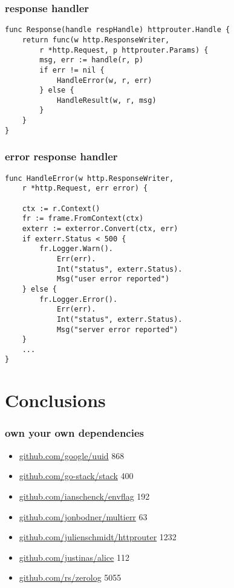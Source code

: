 \documentclass{beamer}
\begin{document}
\begin{frame}[fragile]
\frametitle{response handler}
\begin{lstlisting}[basicstyle=\ttfamily\footnotesize]
func Response(handle respHandle) httprouter.Handle {
	return func(w http.ResponseWriter,
		r *http.Request, p httprouter.Params) {
		msg, err := handle(r, p)
		if err != nil {
			HandleError(w, r, err)
		} else {
			HandleResult(w, r, msg)
		}
	}
}
\end{lstlisting}
\end{frame}

\begin{frame}[fragile]
\frametitle{error response handler}
\begin{lstlisting}[basicstyle=\ttfamily\footnotesize]
func HandleError(w http.ResponseWriter,
	r *http.Request, err error) {

	ctx := r.Context()
	fr := frame.FromContext(ctx)
	exterr := exterror.Convert(ctx, err)
	if exterr.Status < 500 {
		fr.Logger.Warn().
			Err(err).
			Int("status", exterr.Status).
			Msg("user error reported")
	} else {
		fr.Logger.Error().
			Err(err).
			Int("status", exterr.Status).
			Msg("server error reported")
	}
	...
}
\end{lstlisting}
\end{frame}

\section{Conclusions}

\begin{frame}
\frametitle{own your own dependencies}
\begin{itemize}
\item \href{https://github.com/google/uuid}{github.com/google/uuid} 868
\item \href{https://github.com/go-stack/stack}{github.com/go-stack/stack} 400
\item \href{https://github.com/ianschenck/envflag}{github.com/ianschenck/envflag} 192
\item \href{https://github.com/jonbodner/multierr}{github.com/jonbodner/multierr} 63
\item \href{https://github.com/julienschmidt/httprouter}{github.com/julienschmidt/httprouter} 1232
\item \href{https://github.com/justinas/alice}{github.com/justinas/alice} 112
\item \href{https://github.com/rs/zerolog}{github.com/rs/zerolog} 5055
\end{itemize}
\end{frame}
\end{document}
